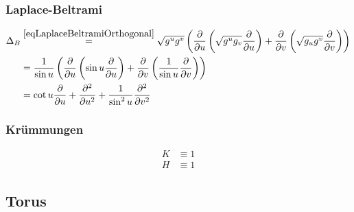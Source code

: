     \subsubsection{Laplace-Beltrami}
      \begin{align}
        \Delta_{B} &\overset{\eqref{eqLaplaceBeltramiOrthogonal}}{=} \sqrt{g^{u}g^{v}} 
                      \left(  \frac{\partial}{\partial u} 
                             \left( \sqrt{g^{u}g_{v}} \frac{\partial}{\partial u} \right) 
                                  + \frac{\partial}{\partial v} \left( \sqrt{g_{u}g^{v}} \frac{\partial}{\partial v} 
                       \right) \right) \\
                   &= \frac{1}{\sin u}
                      \left(  \frac{\partial}{\partial u} 
                             \left( \sin u \frac{\partial}{\partial u} \right) 
                                  + \frac{\partial}{\partial v} \left( \frac{1}{\sin u} \frac{\partial}{\partial v} 
                       \right) \right) \\
                   &= \cot u \frac{\partial}{\partial u} 
                        + \frac{\partial^{2}}{\partial u^{2}}
                        + \frac{1}{\sin^{2} u} \frac{\partial^{2}}{\partial v^{2}}
      \end{align}

     \subsubsection{Krümmungen}
      \begin{align}
        K &\equiv 1 \\
        H &\equiv 1
      \end{align}

  \subsection{Torus}
  \label{torus}

